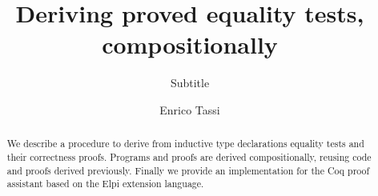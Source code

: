\documentclass[sigplan,10pt,review]{acmart}\settopmatter{printfolios=true,printccs=false,printacmref=false}
\begin{document}
\title[Deriving proved equality tests, compositionally]{Deriving proved equality tests, compositionally}         %
\subtitle{Subtitle}                     %



\author{Enrico Tassi}



\begin{abstract}
We describe a procedure to derive from inductive type declarations
equality tests and their correctness proofs. Programs and proofs
are derived compositionally, reusing code and proofs derived previously.
Finally we provide an implementation for the Coq proof assistant based on the
Elpi extension language.
\end{abstract}
\end{document}
